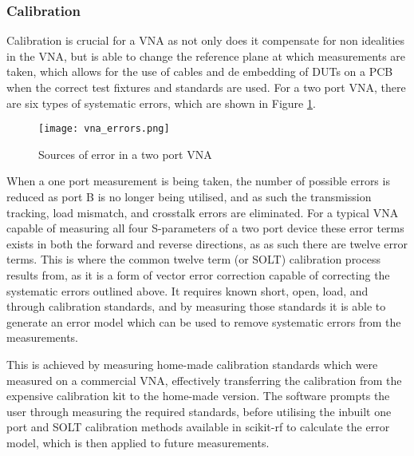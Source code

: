 \subsubsection{Calibration}
Calibration is crucial for a VNA as not only does it compensate for non idealities in the VNA, but is able to change the reference plane at which measurements are taken, which allows for the use of cables and de embedding of DUTs on a PCB when the correct test fixtures and standards are used. For a two port VNA, there are six types of systematic errors, \cite{keysight_vna_cal} which are shown in Figure \ref{fig:vna_error}.
\begin{figure}[H]
	\centering
	\texttt{[image: vna\_errors.png]}
	\caption{Sources of error in a two port VNA}
	\label{fig:vna_error}
\end{figure}
When a one port measurement is being taken, the number of possible errors is reduced as port B is no longer being utilised, and as such the transmission tracking, load mismatch, and crosstalk errors are eliminated. For a typical VNA capable of measuring all four S-parameters of a two port device these error terms exists in both the forward and reverse directions, as as such there are twelve error terms. This is where the common twelve term (or SOLT) calibration process results from, as it is a form of vector error correction capable of correcting the systematic errors outlined above. It requires known short, open, load, and through calibration standards, and by measuring those standards it is able to generate an error model which can be used to remove systematic errors from the measurements. 

This is achieved by measuring home-made calibration standards which were measured on a commercial VNA, effectively transferring the calibration from the expensive calibration kit to the home-made version. The software prompts the user through measuring the required standards, before utilising the inbuilt one port and SOLT calibration methods available in scikit-rf to calculate the error model, which is then applied to future measurements. 



